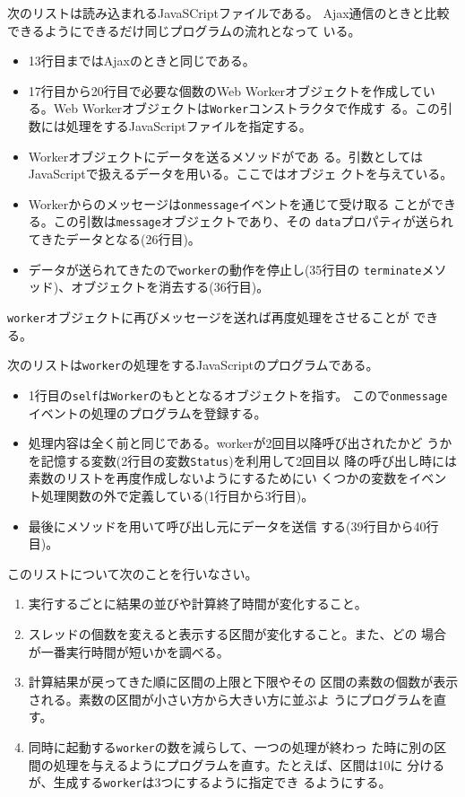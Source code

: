 \begin{Exec}
 次のリストは読み込まれるJavaSCriptファイルである。
 Ajax通信のときと比較できるようにできるだけ同じプログラムの流れとなって
 いる。
 \begin{itemize}
  \item 13行目まではAjaxのときと同じである。
  \item 17行目から20行目で必要な個数のWeb Workerオブジェクトを作成してい
        る。Web Workerオブジェクトは\Verb+Worker+コンストラクタで作成す
        る。この引数には処理をするJavaScriptファイルを指定する。
  \item Workerオブジェクトにデータを送るメソッドがであ
        る。引数としてはJavaScriptで扱えるデータを用いる。ここではオブジェ
        クトを与えている。
  \item Workerからのメッセージは\Verb+onmessage+イベントを通じて受け取る
        ことができる。この引数は\Verb+message+オブジェクトであり、その
        \Verb+data+プロパティが送られてきたデータとなる(26行目)。
  \item データが送られてきたので\Verb+worker+の動作を停止し(35行目の
        \Verb+terminate+メソッド)、オブジェクトを消去する(36行目)。
 \end{itemize}
 \Verb+worker+オブジェクトに再びメッセージを送れば再度処理をさせることが
 できる。

 次のリストは\Verb+worker+の処理をするJavaScriptのプログラムである。
 \begin{itemize}
  \item 1行目の\Verb+self+は\Verb+Worker+のもととなるオブジェクトを指す。
        こので\Verb+onmessage+イベントの処理のプログラムを登録する。
  \item 処理内容は全く前と同じである。workerが2回目以降呼び出されたかど
				うかを記憶する変数(2行目の変数\texttt{Status})を利用して2回目以
				降の呼び出し時には素数のリストを再度作成しないようにするためにい
				くつかの変数をイベント処理関数の外で定義している(1行目から3行目)。
  \item 最後にメソッドを用いて呼び出し元にデータを送信
        する(39行目から40行目)。
 \end{itemize}
\end{Exec}
 \begin{Prob}\upshape このリストについて次のことを行いなさい。
  \begin{enumerate}
   \item 実行するごとに結果の並びや計算終了時間が変化すること。
   \item スレッドの個数を変えると表示する区間が変化すること。また、どの
         場合が一番実行時間が短いかを調べる。
   \item 計算結果が戻ってきた順に区間の上限と下限やその
 区間の素数の個数が表示される。素数の区間が小さい方から大きい方に並ぶよ
 うにプログラムを直す。
   \item 同時に起動する\texttt{worker}の数を減らして、一つの処理が終わっ
         た時に別の区間の処理を与えるようにプログラムを直す。たとえば、区間は10に
         分けるが、生成する\texttt{worker}は3つにするように指定でき
         るようにする。
  \end{enumerate} 
 \end{Prob}
